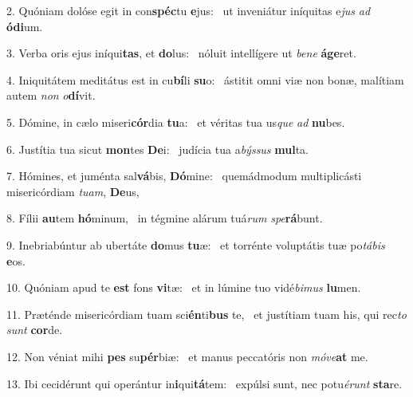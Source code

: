 2. Quóniam dolóse egit in con\textbf{spéc}tu \textbf{e}jus: \ast\  ut inveniátur iníquitas e\textit{jus} \textit{ad} \textbf{ó}\textbf{di}um.\

3. Verba oris ejus iníqui\textbf{tas}, et \textbf{do}lus: \ast\  nóluit intellígere ut \textit{be}\textit{ne} \textbf{á}\textbf{ge}ret.\

4. Iniquitátem meditátus est in cu\textbf{bí}li \textbf{su}o: \ast\  ástitit omni viæ non bonæ, malítiam autem \textit{non} \textit{o}\textbf{dí}vit.\

5. Dómine, in cælo miseri\textbf{cór}dia \textbf{tu}a: \ast\  et véritas tua us\textit{que} \textit{ad} \textbf{nu}bes.\

6. Justítia tua sicut \textbf{mon}tes \textbf{De}i: \ast\  judícia tua a\textit{býs}\textit{sus} \textbf{mul}ta.\

7. Hómines, et juménta sal\textbf{vá}bis, \textbf{Dó}mine: \ast\  quemádmodum multiplicásti misericórdiam \textit{tu}\textit{am}, \textbf{De}us,\

8. Fílii \textbf{au}tem \textbf{hó}minum, \ast\  in tégmine alárum tuá\textit{rum} \textit{spe}\textbf{rá}bunt.\

9. Inebriabúntur ab ubertáte \textbf{do}mus \textbf{tu}æ: \ast\  et torrénte voluptátis tuæ po\textit{tá}\textit{bis} \textbf{e}os.\

10. Quóniam apud te \textbf{est} fons \textbf{vi}tæ: \ast\  et in lúmine tuo vidé\textit{bi}\textit{mus} \textbf{lu}men.\

11. Præténde misericórdiam tuam sci\textbf{én}ti\textbf{bus} te, \ast\  et justítiam tuam his, qui rec\textit{to} \textit{sunt} \textbf{cor}de.\

12. Non véniat mihi \textbf{pes} su\textbf{pér}biæ: \ast\  et manus peccatóris non \textit{mó}\textit{ve}\textbf{at} me.\

13. Ibi cecidérunt qui operántur in\textbf{i}qui\textbf{tá}tem: \ast\  expúlsi sunt, nec potu\textit{é}\textit{runt} \textbf{sta}re.\

